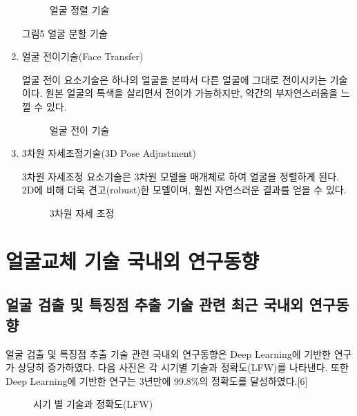 \documentclass{oblivoir}
\begin{document}
\begin{enumerate}
    \begin{figure}[h!]
        \centering
        \caption{얼굴 정렬 기술\cite{reference3}}
    \end{figure}

    그림5  얼굴 분할 기술\cite{reference4}

    \item 얼굴 전이기술(Face Transfer)

    얼굴 전이 요소기술은 하나의 얼굴을 본따서 다른 얼굴에 그대로 전이시키는 기술이다. 원본 얼굴의 특색을 살리면서 전이가 가능하지만, 약간의 부자연스러움을 느낄 수 있다.
    \begin{figure}[h!]
        \centering
        \caption{얼굴 전이 기술\cite{reference4}}
    \end{figure}

    \item  3차원 자세조정기술(3D Pose Adjustment)

    3차원 자세조정 요소기술은 3차원 모델을 매개체로 하여 얼굴을 정렬하게 된다. 2D에 비해 더욱 견고(robust)한 모델이며, 훨씬 자연스러운 결과를 얻을 수 있다. 

    \begin{figure}[h!]
        \centering
        \caption{ 3차원 자세 조정\cite{reference4}}
    \end{figure}
\end{enumerate}

\section{얼굴교체 기술 국내외 연구동향}

\subsection{얼굴 검출 및 특징점 추출 기술 관련 최근 국내외 연구동향}

얼굴 검출 및 특징점 추출 기술 관련 국내외 연구동향은 Deep Learning에 기반한 연구가 상당히 증가하였다. 다음 사진은 각 시기별 기술과 정확도(LFW)를 나타낸다. 또한 Deep Learning에 기반한 연구는 3년만에 99.8\%의 정확도를 달성하였다.[6]


\begin{figure}[h!]
\centering
\caption{ 시기 별 기술과 정확도(LFW) \cite{reference6}}
\end{figure}
\end{document}
